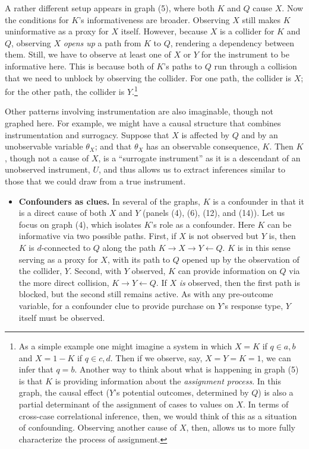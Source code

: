 \documentclass[12pt,]{book}
\providecommand{\tightlist}{%
  \setlength{\itemsep}{0pt}\setlength{\parskip}{0pt}}
\let\rmarkdownfootnote\footnote%
\def\footnote{\protect\rmarkdownfootnote}
\begin{document}
A rather different setup appears in graph (5), where both \(K\) and \(Q\) cause \(X\). Now the conditions for \(K\)'s informativeness are broader. Observing \(X\) still makes \(K\) uninformative as a proxy for \(X\) itself. However, because \(X\) is a collider for \(K\) and \(Q\), observing \(X\) \emph{opens up} a path from \(K\) to \(Q\), rendering a dependency between them. Still, we have to observe at least one of \(X\) or \(Y\) for the instrument to be informative here. This is because both of \(K\)'s paths to \(Q\) run through a collision that we need to unblock by observing the collider. For one path, the collider is \(X\); for the other path, the collider is \(Y\).\footnote{As a simple example one might imagine a system in which \(X = K\) if \(q \in {a,b}\) and \(X = 1-K\) if \(q \in {c,d}\). Then if we observe, say, \(X=Y=K=1\), we can infer that \(q = b\). Another way to think about what is happening in graph (5) is that \(K\) is providing information about the \emph{assignment process}. In this graph, the causal effect (\(Y\)'s potential outcomes, determined by \(Q\)) is also a partial determinant of the assignment of cases to values on \(X\). In terms of cross-case correlational inference, then, we would think of this as a situation of confounding. Observing another cause of \(X\), then, allows us to more fully characterize the process of assignment.}

Other patterns involving instrumentation are also imaginable, though not graphed here. For example, we might have a causal structure that combines instrumentation and surrogacy. Suppose that \(X\) is affected by \(Q\) and by an unobservable variable \(\theta_X\); and that \(\theta_X\) has an observable consequence, \(K\). Then \(K\), though not a cause of \(X\), is a ``surrogate instrument'' \citep{hernan2006instruments} as it is a descendant of an unobserved instrument, \(U\), and thus allows us to extract inferences similar to those that we could draw from a true instrument.

\begin{itemize}
\tightlist
\item
  \textbf{Confounders as clues.} In several of the graphs, \(K\) is a confounder in that it is a direct cause of both \(X\) and \(Y\) (panels (4), (6), (12), and (14)). Let us focus on graph (4), which isolates \(K\)'s role as a confounder. Here \(K\) can be informative via two possible paths. First, if \(X\) is not observed but \(Y\) is, then \(K\) is \(d\)-connected to \(Q\) along the path \(K \rightarrow X \rightarrow Y \leftarrow Q\). \(K\) is in this sense serving as a proxy for \(X\), with its path to \(Q\) opened up by the observation of the collider, \(Y\). Second, with \(Y\) observed, \(K\) can provide information on \(Q\) via the more direct collision, \(K \rightarrow Y \leftarrow Q\). If \(X\) \emph{is} observed, then the first path is blocked, but the second still remains active. As with any pre-outcome variable, for a confounder clue to provide purchase on \(Y\)'s response type, \(Y\) itself must be observed.
\end{itemize}
\end{document}
